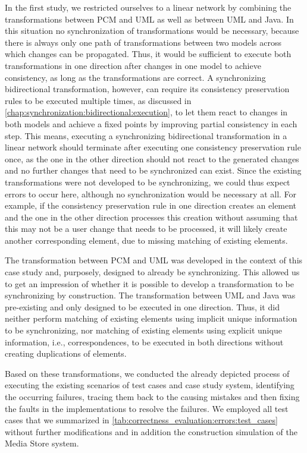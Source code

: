 In the first study, we restricted ourselves to a linear network by combining the transformations between \gls{PCM} and \gls{UML} as well as between \gls{UML} and Java.
In this situation no synchronization of transformations would be necessary, because there is always only one path of transformations between two models across which changes can be propagated.
Thus, it would be sufficient to execute both transformations in one direction after changes in one model to achieve consistency, as long as the transformations are correct.
A synchronizing bidirectional transformation, however, can require its consistency preservation rules to be executed multiple times, as discussed in \autoref{chap:synchronization:bidirectional:execution}, to let them react to changes in both models and achieve a fixed points by improving partial consistency in each step.
This means, executing a synchronizing bidirectional transformation in a linear network should terminate after executing one consistency preservation rule once, as the one in the other direction should not react to the generated changes and no further changes that need to be synchronized can exist.
Since the existing transformations were not developed to be synchronizing, we could thus expect errors to occur here, although no synchronization would be necessary at all.
For example, if the consistency preservation rule in one direction creates an element and the one in the other direction processes this creation without assuming that this may not be a user change that needs to be processed, it will likely create another corresponding element, due to missing matching of existing elements.

The transformation between \gls{PCM} and \gls{UML} was developed in the context of this case study and, purposely, designed to already be synchronizing.
This allowed us to get an impression of whether it is possible to develop a transformation to be synchronizing by construction.
The transformation between \gls{UML} and Java was pre-existing and only designed to be executed in one direction.
Thus, it did neither perform matching of existing elements using implicit unique information to be synchronizing, nor matching of existing elements using explicit unique information, i.e., correspondences, to be executed in both directions without creating duplications of elements.

Based on these transformations, we conducted the already depicted process of executing the existing scenarios of test cases and case study system, identifying the occurring failures, tracing them back to the causing mistakes and then fixing the faults in the implementations to resolve the failures.
We employed all test cases that we summarized in \autoref{tab:correctness_evaluation:errors:test_cases} without further modifications and in addition the construction simulation of the Media Store system.

